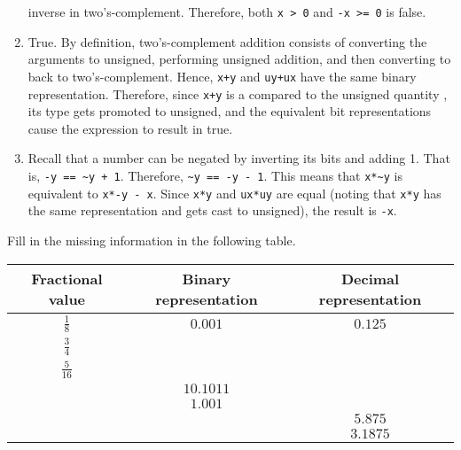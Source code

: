 \documentclass[12pt]{article}
\newenvironment{ex}[2][Exercise]{\begin{trivlist}
		\item[\hskip \labelsep {\bfseries #1}\hskip \labelsep {\bfseries #2.}]}{\end{trivlist}}
\newenvironment{sol}[1][Solution]{\begin{trivlist}
		\item[\hskip \labelsep {\bfseries #1:}]}{\end{trivlist}}
\begin{document}
\begin{sol}
\begin{enumerate}[label=(\alph*)]
		inverse in two's-complement. Therefore, both \texttt{x > 0} and \texttt{-x >= 0} is
		false.
		\item True. By definition, two's-complement addition consists of converting the arguments
		to unsigned, performing unsigned addition, and then converting to back to two's-complement.
		Hence, \texttt{x+y} and \texttt{uy+ux} have the same binary representation. Therefore,
		since \texttt{x+y} is a compared to the unsigned quantity , its type
		gets promoted to unsigned, and the equivalent bit representations cause the expression
		to result in true.
		\item Recall that a number can be negated by inverting its bits and adding 1.
		That is, \texttt{-y == \texttt{\~{}y + 1}}. Therefore, \texttt{\~{}y == -y - 1}.
		This means that \texttt{x*\~{}y} is equivalent to \texttt{x*-y - x}. Since
		\texttt{x*y} and \texttt{ux*uy} are equal (noting that \texttt{x*y} has the same
		representation and gets cast to unsigned), the result is \texttt{-x}.
	\end{enumerate}
\end{sol}

\begin{ex}{2.45}
	Fill in the missing information in the following table.
	\begin{center}
		\begin{tabular}{ccc}
			Fractional value & Binary representation & Decimal representation \\
			\hline
			$\frac{1}{8}$ &  $0.001$ & $0.125$\\
			$\frac{3}{4}$ & \makebox[1cm]{\hrulefill}& \makebox[1cm]{\hrulefill}\\
			$\frac{5}{16}$ & \makebox[1cm]{\hrulefill} & \makebox[1cm]{\hrulefill}\\
			\makebox[1cm]{\hrulefill} & $10.1011$ & \makebox[1cm]{\hrulefill}\\
			\makebox[1cm]{\hrulefill} & $1.001$ & \makebox[1cm]{\hrulefill}\\
			\makebox[1cm]{\hrulefill} & \makebox[1cm]{\hrulefill} & $5.875$\\
			\makebox[1cm]{\hrulefill} & \makebox[1cm]{\hrulefill} & $3.1875$
		\end{tabular}
	\end{center}
\end{ex}
\end{document}
